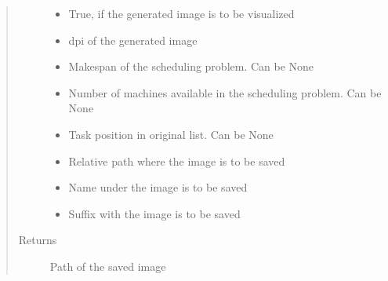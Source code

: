 \documentclass[letterpaper,10pt,english]{sphinxmanual}
\begin{document}
\begin{fulllineitems}
\begin{fulllineitems}
\begin{quote}
\begin{description}
\begin{itemize}
\item {} 
\sphinxAtStartPar
{} \textendash{} True, if the generated image is to be visualized

\item {} 
\sphinxAtStartPar
{} \textendash{} dpi of the generated image

\item {} 
\sphinxAtStartPar
{} \textendash{} Makespan of the scheduling problem. Can be None

\item {} 
\sphinxAtStartPar
{} \textendash{} Number of machines available in the scheduling problem. Can be None

\item {} 
\sphinxAtStartPar
{} \textendash{} Task position in original list. Can be None

\item {} 
\sphinxAtStartPar
{} \textendash{} Relative path where the image is to be saved

\item {} 
\sphinxAtStartPar
{} \textendash{} Name under the image is to be saved

\item {} 
\sphinxAtStartPar
{} \textendash{} Suffix with the image is to be saved

\end{itemize}

\item[{Returns}] \leavevmode
\sphinxAtStartPar
Path of the saved image

\end{description}\end{quote}

\end{fulllineitems}



\end{fulllineitems}
\end{document}
